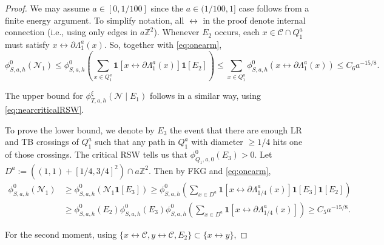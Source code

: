 \documentclass[article,12pt,reqno]{amsart}
\begin{document}
\begin{proof}
    We may assume $a\in[0,1/100]$ since the $a\in(1/100,1]$ case follows from a finite energy argument. To simplify notation, all $\longleftrightarrow$ in the proof denote internal connection (i.e., using only edges in $a\mathbb{Z}^2$).
	Whenever $E_2$ occurs, each $x\in \mathscr{C}\cap Q^a_1$ must satisfy $x\longleftrightarrow \partial \Lambda_{1}^a(x)$. So, together with \eqref{eq:onearm},
	\[\phi_{S,a,h}^0(\mathcal{N}_1)\leq \phi_{S,a,h}^0\left(\sum_{x\in Q_1^a}\mathbf{1}[x\longleftrightarrow \partial \Lambda^a_{1}(x)]\mathbf{1}[E_2]\right)\leq \sum_{x\in Q_1^a}\phi_{S,a,h}^0(x\longleftrightarrow \partial \Lambda^a_{1}(x))\leq C_6 a^{-15/8}.\]
	
	The upper bound for $\phi_{T,a,h}^{\xi}(\mathcal{N} \mid E_1)$ follows in a similar way, using \eqref{eq:nearcriticalRSW}.
	
	To prove the lower bound, we denote by $E_3$ the event that there are enough LR and TB crossings of $Q^a_1$ such that any path in $Q_1^a$ with diameter $\geq 1/4$ hits one of those crossings. The critical RSW tells us that $\phi_{Q_1,a,0}^0(E_3)>0$. Let $D^a:=((1,1)+[1/4,3/4]^2)\cap a\mathbb{Z}^2$. Then by FKG and \eqref{eq:onearm}, 
	\begin{align*}
		\phi_{S,a,h}^0(\mathcal{N}_1) &\geq \phi_{S,a,h}^0(\mathcal{N}_1\mathbf{1}[E_3])\geq \phi_{S,a,h}^0\left(\sum_{x\in D^a}\mathbf{1}[x\longleftrightarrow\partial \Lambda_{1/4}^a(x)]\mathbf{1}[E_3]\mathbf{1}[E_2]\right)\\
		&\geq \phi_{S,a,h}^0(E_2)  \phi_{S,a,h}^0(E_3) \phi_{S,a,h}^0\left(\sum_{x\in D^a}\mathbf{1}[x\longleftrightarrow\partial \Lambda_{1/4}^a(x)]\right) \geq C_5 a^{-15/8}.
	\end{align*}

	
	For the second moment, using $\{x \longleftrightarrow \mathscr{C}, y\longleftrightarrow \mathscr{C}, E_2\}\subset \{x \longleftrightarrow y\}$,


\end{proof}
\end{document}
